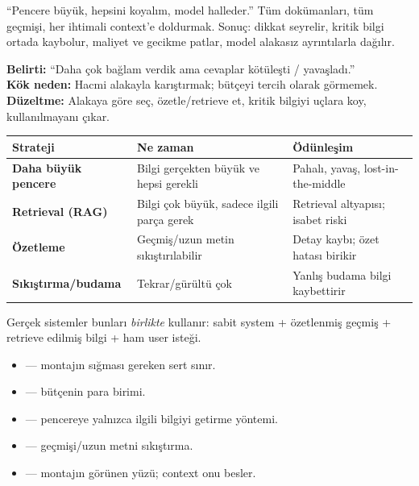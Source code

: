 \begin{antibox}
``Pencere büyük, hepsini koyalım, model halleder.'' Tüm dokümanları, tüm geçmişi,
her ihtimali context'e doldurmak. Sonuç: dikkat seyrelir, kritik bilgi ortada
kaybolur, maliyet ve gecikme patlar, model alakasız ayrıntılarla dağılır.

\smallskip
\textbf{Belirti:} ``Daha çok bağlam verdik ama cevaplar kötüleşti / yavaşladı.''\\
\textbf{Kök neden:} Hacmi alakayla karıştırmak; bütçeyi tercih olarak görmemek.\\
\textbf{Düzeltme:} Alakaya göre seç, özetle/retrieve et, kritik bilgiyi uçlara koy, kullanılmayanı çıkar.
\end{antibox}

\vspace{2pt}
\begin{tabularx}{\linewidth}{@{}>{\raggedright\arraybackslash}p{30mm} L L@{}}
\toprule
{\sffamily\bfseries\small Strateji} &
{\sffamily\bfseries\small Ne zaman} &
{\sffamily\bfseries\small Ödünleşim} \\
\midrule
\textbf{Daha büyük pencere} & Bilgi gerçekten büyük ve hepsi gerekli &
Pahalı, yavaş, lost-in-the-middle \\
\addlinespace[3pt]
\textbf{Retrieval (RAG)} & Bilgi çok büyük, sadece ilgili parça gerek &
Retrieval altyapısı; isabet riski \\
\addlinespace[3pt]
\textbf{Özetleme} & Geçmiş/uzun metin sıkıştırılabilir &
Detay kaybı; özet hatası birikir \\
\addlinespace[3pt]
\textbf{Sıkıştırma/budama} & Tekrar/gürültü çok &
Yanlış budama bilgi kaybettirir \\
\bottomrule
\end{tabularx}

\vspace{4pt}
Gerçek sistemler bunları \emph{birlikte} kullanır: sabit system + özetlenmiş
geçmiş + retrieve edilmiş bilgi + ham user isteği.

\begin{itemize}
  \item {} --- montajın sığması gereken sert sınır.
  \item {} --- bütçenin para birimi.
  \item {} --- pencereye yalnızca ilgili bilgiyi getirme yöntemi.
  \item {} --- geçmişi/uzun metni sıkıştırma.
  \item {} --- montajın görünen yüzü; context onu besler.
\end{itemize}

